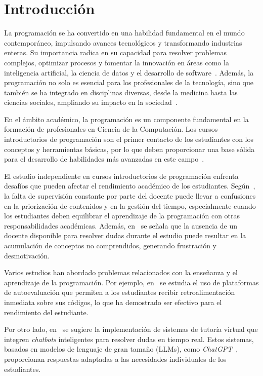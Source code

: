 \chapter*{Introducción}\label{chapter:introduction}

La programación se ha convertido en una habilidad fundamental en el mundo contemporáneo, impulsando avances tecnológicos y transformando industrias enteras. Su importancia radica en su capacidad para resolver problemas complejos, optimizar procesos y fomentar la innovación en áreas como la inteligencia artificial, la ciencia de datos y el desarrollo de software~\cite{wing2006computational}. Además, la programación no solo es esencial para los profesionales de la tecnología, sino que también se ha integrado en disciplinas diversas, desde la medicina hasta las ciencias sociales, ampliando su impacto en la sociedad~\cite{resnick2009scratch}.

En el ámbito académico, la programación es un componente fundamental en la formación de profesionales en Ciencia de la Computación. Los cursos introductorios de programación son el primer contacto de los estudiantes con los conceptos y herramientas básicas, por lo que deben proporcionar una base sólida para el desarrollo de habilidades más avanzadas en este campo~\cite{Sarsa_2022}.

El estudio independiente en cursos introductorios de programación enfrenta desafíos que pueden afectar el rendimiento académico de los estudiantes. Según~\cite{proskuraLytvynova2020}, la falta de supervisión constante por parte del docente puede llevar a confusiones en la priorización de contenidos y en la gestión del tiempo, especialmente cuando los estudiantes deben equilibrar el aprendizaje de la programación con otras responsabilidades académicas. Además, en~\cite{overklift2019} se señala que la ausencia de un docente disponible para resolver dudas durante el estudio puede resultar en la acumulación de conceptos no comprendidos, generando frustración y desmotivación.

Varios estudios han abordado problemas relacionados con la enseñanza y el aprendizaje de la programación. Por ejemplo, en~\cite{Gabbay2022, Hanafi2023, Messer2024} se estudia el uso de plataformas de autoevaluación que permiten a los estudiantes recibir retroalimentación inmediata sobre sus códigos, lo que ha demostrado ser efectivo para el rendimiento del estudiante.

Por otro lado, en~\cite{dong2025buildaitutoradapt} se sugiere la implementación de sistemas de tutoría virtual que integren \textit{chatbots} inteligentes para resolver dudas en tiempo real. Estos sistemas, basados en modelos de lenguaje de gran tamaño (LLMs), como \textit{ChatGPT}~\cite{chatgpt}, proporcionan respuestas adaptadas a las necesidades individuales de los estudiantes.

